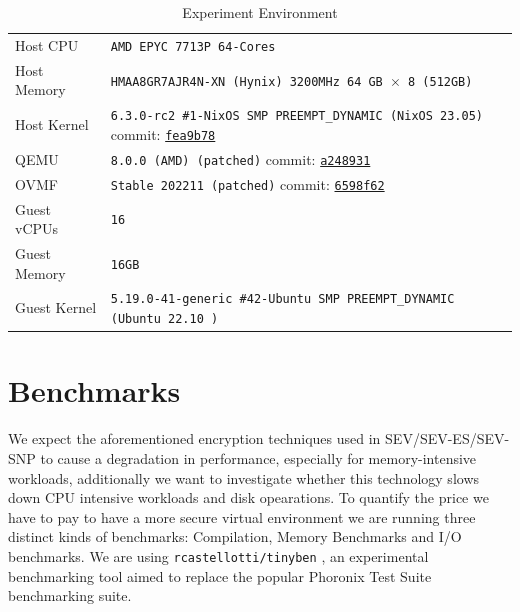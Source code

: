 \documentclass[twocolumn]{article}
\begin{document}
\begin{table}[ht]
    \small
    \centering
    \begin{tabular}{l|l}
        \hline
        Host CPU      & \texttt{AMD EPYC 7713P 64-Cores}                                            \\
        Host Memory   & \texttt{HMAA8GR7AJR4N-XN (Hynix) 3200MHz 64 GB $\times$ 8 (512GB)}          \\
        Host Kernel   & \texttt{6.3.0-rc2 \#1-NixOS SMP PREEMPT\_DYNAMIC (NixOS 23.05)} commit: \href{https://github.com/AMDESE/linux/tree/fea9b785bfa90e015c7d81526e36060da1bf01d1}{\texttt{fea9b78}}            \\
        QEMU          & \texttt{8.0.0 (AMD) (patched)} commit: \href{https://github.com/AMDESE/qemu/tree/a248931547843b9edb0f3b0c7d6d0c76ffdf7659}{\texttt{a248931}}                                             \\
        OVMF          & \texttt{Stable 202211 (patched)} commit: \href{https://github.com/AMDESE/ovmf/commit/6598f62bda4eb884c65d6c0aed7ede64258a41d8}{\texttt{6598f62}}                                     \\
        Guest vCPUs   & \texttt{16}                                                                 \\
        Guest Memory  & \texttt{16GB}                                                               \\
        Guest Kernel  & \texttt{5.19.0-41-generic \#42-Ubuntu SMP PREEMPT\_DYNAMIC (Ubuntu 22.10 )} \\ 
        \hline
    \end{tabular}
    \caption{Experiment Environment}
    \label{tab:experiment-environment}
\end{table}

\section{Benchmarks}
We expect the aforementioned encryption techniques used in SEV/SEV-ES/SEV-SNP to cause a degradation in performance, especially for memory-intensive workloads, additionally we want to investigate whether this technology slows down CPU intensive workloads and disk opearations. To quantify the price we have to pay to have a more secure virtual environment we are running three distinct kinds of benchmarks: Compilation, Memory Benchmarks and I/O benchmarks. We are using \texttt{rcastellotti/tinyben} \cite{tinyben}, an experimental benchmarking tool aimed to replace the popular Phoronix Test Suite \cite{pts} benchmarking suite.
\end{document}
